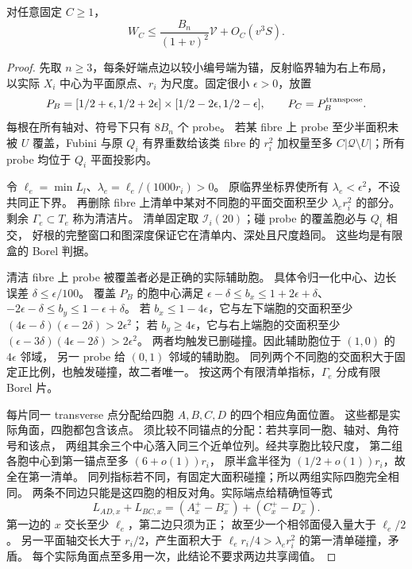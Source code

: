 \begin{lemma}[自适应软权容量]\label{seventh:soft-capacity}
对任意固定 \(C\ge1\)，
\begin{equation}\label{seventh:soft-weight}
 W_C\le\frac{B_n}{(1+v)^2}\mathcal V+O_C(v^3S).
\end{equation}
\end{lemma}
\begin{proof}
先取 \(n\ge3\)，每条好端点边以较小编号端为锚，反射临界轴为右上布局，
以实际 \(X_i\) 中心为平面原点、\(r_i\) 为尺度。固定很小
\(\epsilon>0\)，放置
\[
 P_B=[1/2+\epsilon,1/2+2\epsilon]\times[1/2-2\epsilon,1/2-\epsilon],
 \qquad P_C=P_B^{\rm transpose}.
\]
每根在所有轴对、符号下只有 \(8B_n\) 个 probe。
若某 fibre 上 probe 至少半面积未被 \(U\) 覆盖，Fubini 与原 \(Q_i\)
有界重数给该类 fibre 的 \(r_i^2\) 加权量至多
\(C|\mathcal Q\setminus U|\)；所有 probe 均位于 \(Q_i\) 平面投影内。

令 \(\ell_e=\min L_l\)、\(\lambda_e=\ell_e/(1000r_i)>0\)。
原临界坐标界使所有 \(\lambda_e<\epsilon^2\)，不设共同正下界。
再删除 fibre 上清单中某对不同胞的平面交面积至少
\(\lambda_e r_i^2\) 的部分。剩余 \(\Gamma_e\subset T_e\) 称为清洁片。
清单固定取 \(\mathcal I_i(20)\)；碰 probe 的覆盖胞必与 \(Q_i\) 相交，
好根的完整窗口和图深度保证它在清单内、深处且尺度趋同。
这些均是有限盒的 Borel 判据。

清洁 fibre 上 probe 被覆盖者必是正确的实际辅助胞。
具体令归一化中心、边长误差 \(\delta\le\epsilon/100\)。
覆盖 \(P_B\) 的胞中心满足
\(\epsilon-\delta\le b_x\le1+2\epsilon+\delta\)、
\(-2\epsilon-\delta\le b_y\le1-\epsilon+\delta\)。
若 \(b_x\le1-4\epsilon\)，它与左下端胞的交面积至少
\((4\epsilon-\delta)(\epsilon-2\delta)>2\epsilon^2\)；
若 \(b_y\ge4\epsilon\)，它与右上端胞的交面积至少
\((\epsilon-3\delta)(4\epsilon-2\delta)>2\epsilon^2\)。
两者均触发已删碰撞。因此辅助胞位于 \((1,0)\) 的 \(4\epsilon\) 邻域，
另一 probe 给 \((0,1)\) 邻域的辅助胞。
同列两个不同胞的交面积大于固定正比例，也触发碰撞，故二者唯一。
按这两个有限清单指标，\(\Gamma_e\) 分成有限 Borel 片。

每片同一 transverse 点分配给四胞 \(A,B,C,D\) 的四个相应角面位置。
这些都是实际角面，四胞都包含该点。
须比较不同锚点的分配：若共享同一胞、轴对、角符号和该点，
两组其余三个中心落入同三个近单位列。经共享胞比较尺度，
第二组各胞中心到第一锚点至多 \((6+o(1))r_i\)，
原半盒半径为 \((1/2+o(1))r_i\)，故全在第一清单。
同列指标若不同，有固定大面积碰撞；所以两组实际四胞完全相同。
两条不同边只能是这四胞的相反对角。实际端点给精确恒等式
\[
 L_{AD,x}+L_{BC,x}=(A_x^+-B_x^-)+(C_x^+-D_x^-).
\]
第一边的 \(x\) 交长至少 \(\ell_e\)，第二边只须为正；
故至少一个相邻面侵入量大于 \(\ell_e/2\)。
另一平面轴交长大于 \(r_i/2\)，产生面积大于
\(\ell_er_i/4>\lambda_er_i^2\) 的第一清单碰撞，矛盾。
每个实际角面点至多用一次，此结论不要求两边共享阈值。


\end{proof}
